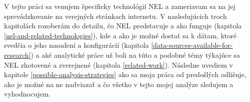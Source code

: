 
V tejto práci sa venujem špecificky technológií NEL a zameriavam sa na jej sprevádzkovanie na verejných stránkach 
internetu. V nasledujúcich troch kapitolách rozoberám do detailu, čo NEL predstavuje a ako funguje 
(kapitola \ref{nel-and-related-technologies}), kde a ako je možné dostať sa k dátam, ktoré svedčia o jeho nasadení a 
konfigurácií (kapitola \ref{data-sources-available-for-research}) a aké analytické práce už boli na túto a podobné témy
týkajúce sa NEL zhotovené a zverejnené (kapitola \ref{related-work}). Následne uvediem v kapitole 
\ref{possible-analysis-strategies} ako sa moja práca od predošlých odlišuje, ako je možné na ne nadviazať a čo všetko
v tejto mojej analýze sledujem a vyhodnocujem. 
